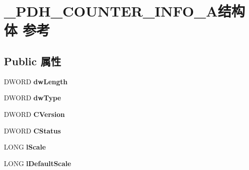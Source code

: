 \hypertarget{struct___p_d_h___c_o_u_n_t_e_r___i_n_f_o___a}{}\section{\+\_\+\+P\+D\+H\+\_\+\+C\+O\+U\+N\+T\+E\+R\+\_\+\+I\+N\+F\+O\+\_\+\+A结构体 参考}
\label{struct___p_d_h___c_o_u_n_t_e_r___i_n_f_o___a}
\subsection*{Public 属性}
\begin{DoxyCompactItemize}
\item 
\mbox{\label{struct___p_d_h___c_o_u_n_t_e_r___i_n_f_o___a_a4912838ad65160d345a237e69240d802}} 
D\+W\+O\+RD {\bfseries dw\+Length}
\item 
\mbox{\label{struct___p_d_h___c_o_u_n_t_e_r___i_n_f_o___a_ad4d53af16eadb769098e54b465bb7245}} 
D\+W\+O\+RD {\bfseries dw\+Type}
\item 
\mbox{\label{struct___p_d_h___c_o_u_n_t_e_r___i_n_f_o___a_ac65a85adb1f2215d49fdd00456ca794e}} 
D\+W\+O\+RD {\bfseries C\+Version}
\item 
\mbox{\label{struct___p_d_h___c_o_u_n_t_e_r___i_n_f_o___a_a352a94f31d5a68cb415a01195da9794e}} 
D\+W\+O\+RD {\bfseries C\+Status}
\item 
\mbox{\label{struct___p_d_h___c_o_u_n_t_e_r___i_n_f_o___a_a7f723e21abae19a87dbd9db808b7d682}} 
L\+O\+NG {\bfseries l\+Scale}
\item 
\mbox{\label{struct___p_d_h___c_o_u_n_t_e_r___i_n_f_o___a_a9c05820f80b44002a29615c12675c863}} 
L\+O\+NG {\bfseries l\+Default\+Scale}
\item 
\mbox{\label{struct___p_d_h___c_o_u_n_t_e_r___i_n_f_o___a_a850a825e0abd193b0802f50a32d8e1c8}} 

\end{DoxyCompactItemize}
